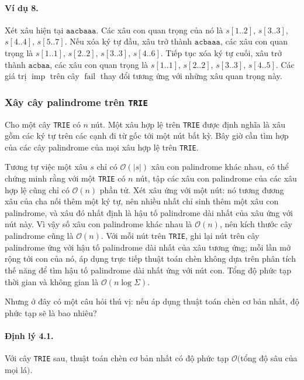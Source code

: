 \documentclass[11pt]{article}
\newcommand{\Oh}{\mathcal{O}}
\begin{document}
\paragraph{Ví dụ 8.}
Xét xâu hiện tại \(\texttt{aacbaaa}\). Các xâu con quan trọng của nó là
\(s[1..2]\), \(s[3..3]\), \(s[4..4]\), \(s[5..7]\). Nếu xóa ký tự đầu, xâu
trở thành \(\texttt{acbaaa}\), các xâu con quan trọng là \(s[1..1]\),
\(s[2..2]\), \(s[3..3]\), \(s[4..6]\). Tiếp tục xóa ký tự cuối, xâu trở thành
\(\texttt{acbaa}\), các xâu con quan trọng là \(s[1..1]\), \(s[2..2]\),
\(s[3..3]\), \(s[4..5]\). Các giá trị \(\operatorname{imp}\) trên cây
\(\operatorname{fail}\) thay đổi tương ứng với những xâu quan trọng này.

\subsubsection{Xây cây palindrome trên \texttt{TRIE}}

Cho một cây \texttt{TRIE} có \(n\) nút. Một xâu hợp lệ trên \texttt{TRIE} được
định nghĩa là xâu gồm các ký tự trên các cạnh đi từ gốc tới một nút bất kỳ.
Bây giờ cần tìm hợp của các cây palindrome của mọi xâu hợp lệ trên
\texttt{TRIE}.

Tương tự việc một xâu \(s\) chỉ có \(\Oh(|s|)\) xâu con palindrome khác nhau,
có thể chứng minh rằng với một \texttt{TRIE} có \(n\) nút, tập các xâu con
palindrome của các xâu hợp lệ cũng chỉ có \(\Oh(n)\) phần tử. Xét xâu ứng với
một nút: nó tương đương xâu của cha nối thêm một ký tự, nên nhiều nhất chỉ
sinh thêm một xâu con palindrome, và xâu đó nhất định là hậu tố palindrome dài
nhất của xâu ứng với nút này. Vì vậy số xâu con palindrome khác nhau là
\(\Oh(n)\), nên kích thước cây palindrome cũng là \(\Oh(n)\). Với mỗi nút trên
\texttt{TRIE}, ghi lại nút trên cây palindrome ứng với hậu tố palindrome dài
nhất của xâu tương ứng; mỗi lần mở rộng tới con của nó, áp dụng trực tiếp
thuật toán chèn không dựa trên phân tích thế năng để tìm hậu tố palindrome dài
nhất ứng với nút con. Tổng độ phức tạp thời gian và không gian là
\(\Oh(n\log \Sigma)\).

Nhưng ở đây có một câu hỏi thú vị: nếu áp dụng thuật toán chèn cơ bản nhất,
độ phức tạp sẽ là bao nhiêu?

\paragraph{Định lý 4.1.}
Với cây \texttt{TRIE} sau, thuật toán chèn cơ bản nhất có độ phức tạp
\(\Oh(\)tổng độ sâu của mọi lá\()\).
\end{document}
